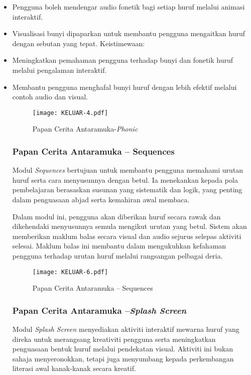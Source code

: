 \begin{itemize}
    \item Pengguna boleh mendengar audio fonetik bagi setiap huruf melalui animasi interaktif.
    \item Visualisasi bunyi dipaparkan untuk membantu pengguna mengaitkan huruf dengan sebutan yang tepat. Keistimewaan:
    \item Meningkatkan pemahaman pengguna terhadap bunyi dan fonetik huruf melalui pengalaman interaktif.
    \item Membantu pengguna menghafal bunyi huruf dengan lebih efektif melalui contoh audio dan visual.

\begin{figure}[h]
    \centering
    \texttt{[image: KELUAR-4.pdf]}
 \caption{Papan Cerita Antaramuka-\textit{Phonic}}
    \label{fig:enter-label}
\end{figure}

\vspace{14cm}


\subsubsection{Papan Cerita Antaramuka – Sequences}

Modul \textit{Sequences} bertujuan untuk membantu pengguna memahami urutan huruf serta cara menyusunnya dengan betul. Ia menekankan kepada pola pembelajaran berasaskan susunan yang sistematik dan logik, yang penting dalam penguasaan abjad serta kemahiran awal membaca.

Dalam modul ini, pengguna akan diberikan huruf secara rawak dan dikehendaki menyusunnya semula mengikut urutan yang betul. Sistem akan memberikan maklum balas secara visual dan audio sejurus selepas aktiviti selesai. Maklum balas ini membantu dalam mengukuhkan kefahaman pengguna terhadap urutan huruf melalui rangsangan pelbagai deria.

\begin{figure}
    \centering
    \texttt{[image: KELUAR-6.pdf]}
    \caption{Papan Cerita Antaramuka – Sequences}
    \label{fig:enter-label}
\end{figure}

\subsubsection{Papan Cerita Antaramuka –\textit{Splash Screen}}

Modul \textit{Splash Screen} menyediakan aktiviti interaktif mewarna huruf yang direka untuk merangsang kreativiti pengguna serta meningkatkan penguasaan bentuk huruf melalui pendekatan visual. Aktiviti ini bukan sahaja menyeronokkan, tetapi juga menyumbang kepada perkembangan literasi awal kanak-kanak secara kreatif.


\end{itemize}
